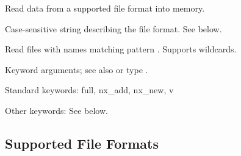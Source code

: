 \documentclass[letterpaper,11pt,english]{sphinxmanual}
\begin{document}
\begin{fulllineitems}
\end{fulllineitems}



\begin{fulllineitems}
\end{fulllineitems}


\begin{DUlineblock}{0em}
\item[] Read data from a supported file format into memory.
\item[] 
\item[] 
\item[] Case-sensitive string describing the file format. See below.
\item[] 
\item[] 
\item[] Read files with names matching pattern . Supports wildcards.
\item[] 
\item[] 
\item[] Keyword arguments; see also {\hyperref[\detokenize{src/Appendices/keywords:dkw}]{}} or type .
\item[] Standard keywords: full, nx\_add, nx\_new, v
\item[] Other keywords: See below.
\end{DUlineblock}


\subsection{Supported File Formats}
\label{\detokenize{src/Formats/timeseries:supported-file-formats}}
\end{document}
